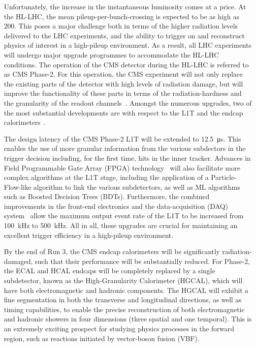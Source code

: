 Unfortunately, the increase in the instantaneous luminosity comes at a price. At the HL-LHC, the mean pileup-per-bunch-crossing is expected to be as high as 200. This poses a major challenge both in terms of the higher radiation levels delivered to the LHC experiments, and the ability to trigger on and reconstruct physics of interest in a high-pileup environment. As a result, all LHC experiments will undergo major upgrade programmes to accommodate the HL-LHC conditions. The operation of the CMS detector during the HL-LHC is referred to as CMS Phase-2. For this operation, the CMS experiment will not only replace the existing parts of the detector with high levels of radiation damage, but will improve the functionality of these parts in terms of the radiation-hardness and the granularity of the readout channels~\cite{Contardo:2020886}. Amongst the numerous upgrades, two of the most substantial developments are with respect to the L1T and the endcap calorimeters~\cite{CERN-LHCC-2017-023,CERN-LHCC-2020-004}.

The design latency of the CMS Phase-2 L1T will be extended to \SI{12.5}{\micro\second}. This enables the use of more granular information from the various subdectors in the trigger decision including, for the first time, hits in the inner tracker. Advances in Field Programmable Gate Array (FPGA) technology~\cite{Duarte_2018}  will also facilitate more complex algorithms at the L1T stage, including the application of a Particle-Flow-like algorithm to link the various subdetectors, as well as 
ML algorithms such as Boosted Decision Trees (BDTs). Furthermore, the combined improvements in the front-end electronics and the data-acquisition (DAQ) system~\cite{CERN-LHCC-2017-014} allow the maximum output event rate of the L1T to be increased from 100~kHz to 500~kHz. All in all, these upgrades are crucial for maintaining an excellent trigger efficiency in a high-pileup environment.

By the end of Run 3, the CMS endcap calorimeters will be significantly radiation-damaged, such that their performance will be substantially reduced. For Phase-2, the ECAL and HCAL endcaps will be completely replaced by a single subdetector, known as the High-Granularity Calorimeter (HGCAL), which will have both electromagnetic and hadronic components. The HGCAL will exhibit a fine segmentation in both the transverse and longitudinal directions, as well as timing capabilities, to enable the precise reconstruction of both electromagnetic and hadronic showers in four dimensions (three spatial and one temporal). This is an extremely exciting prospect for studying physics processes in the forward region, such as reactions initiated by vector-boson fusion (VBF).

